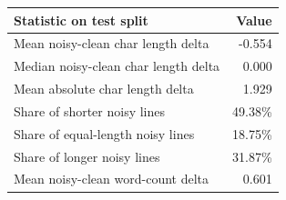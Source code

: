 \begin{tabular}{lr}
\toprule
Statistic on test split & Value \\
\midrule
Mean noisy-clean char length delta & -0.554 \\
Median noisy-clean char length delta & 0.000 \\
Mean absolute char length delta & 1.929 \\
Share of shorter noisy lines & 49.38\% \\
Share of equal-length noisy lines & 18.75\% \\
Share of longer noisy lines & 31.87\% \\
Mean noisy-clean word-count delta & 0.601 \\
\bottomrule
\end{tabular}
